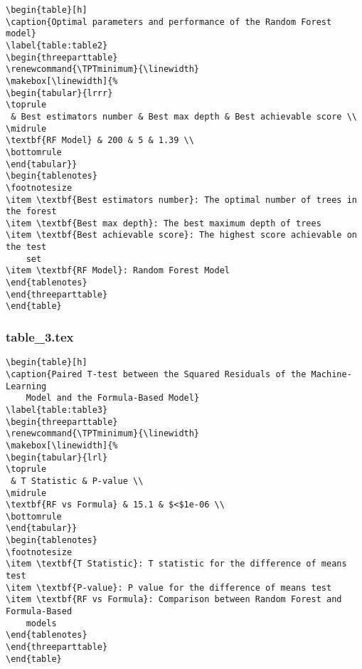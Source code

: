 \documentclass[11pt]{article}
\begin{document}
\begin{Verbatim}[tabsize=4]
\begin{table}[h]
\caption{Optimal parameters and performance of the Random Forest model}
\label{table:table2}
\begin{threeparttable}
\renewcommand{\TPTminimum}{\linewidth}
\makebox[\linewidth]{%
\begin{tabular}{lrrr}
\toprule
 & Best estimators number & Best max depth & Best achievable score \\
\midrule
\textbf{RF Model} & 200 & 5 & 1.39 \\
\bottomrule
\end{tabular}}
\begin{tablenotes}
\footnotesize
\item \textbf{Best estimators number}: The optimal number of trees in the forest
\item \textbf{Best max depth}: The best maximum depth of trees
\item \textbf{Best achievable score}: The highest score achievable on the test
	set
\item \textbf{RF Model}: Random Forest Model
\end{tablenotes}
\end{threeparttable}
\end{table}

\end{Verbatim}

\subsubsection*{table\_3.tex}

\begin{Verbatim}[tabsize=4]
\begin{table}[h]
\caption{Paired T-test between the Squared Residuals of the Machine-Learning
	Model and the Formula-Based Model}
\label{table:table3}
\begin{threeparttable}
\renewcommand{\TPTminimum}{\linewidth}
\makebox[\linewidth]{%
\begin{tabular}{lrl}
\toprule
 & T Statistic & P-value \\
\midrule
\textbf{RF vs Formula} & 15.1 & $<$1e-06 \\
\bottomrule
\end{tabular}}
\begin{tablenotes}
\footnotesize
\item \textbf{T Statistic}: T statistic for the difference of means test
\item \textbf{P-value}: P value for the difference of means test
\item \textbf{RF vs Formula}: Comparison between Random Forest and Formula-Based
	models
\end{tablenotes}
\end{threeparttable}
\end{table}

\end{Verbatim}
\end{document}
